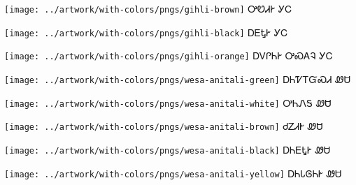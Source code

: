\documentclass[avery5371]{flashcards}%
\begin{document}
    \begin{flashcard}{
        \texttt{[image: ../artwork/with-colors/pngs/gihli-brown]}
    }
        \Huge ᎤᏬᏗᎨ ᎩᏟ
    \end{flashcard}

    \begin{flashcard}{
        \texttt{[image: ../artwork/with-colors/pngs/gihli-black]}
    }
        \Huge ᎠᎬᎿᎨ ᎩᏟ
    \end{flashcard}

    \begin{flashcard}{
        \texttt{[image: ../artwork/with-colors/pngs/gihli-orange]}
    }
        \Huge ᎠᏙᎵᏂᎨ ᎤᏍᎪᎸ ᎩᏟ
    \end{flashcard}

    \begin{flashcard}{
        \texttt{[image: ../artwork/with-colors/pngs/wesa-anitali-green]}
    }
        \Huge ᎠᏂᏤᎢᏳᏍᏗ ᏪᏌ
    \end{flashcard}

    \begin{flashcard}{
        \texttt{[image: ../artwork/with-colors/pngs/wesa-anitali-white]}
    }
        \Huge ᎤᏂᏁᎦ ᏪᏌ
    \end{flashcard}

    \begin{flashcard}{
        \texttt{[image: ../artwork/with-colors/pngs/wesa-anitali-brown]}
    }
        \Huge ᏧᏃᏗᎨ ᏪᏌ
    \end{flashcard}

    \begin{flashcard}{
        \texttt{[image: ../artwork/with-colors/pngs/wesa-anitali-black]}
    }
        \Huge ᎠᏂᎬᎿᎨ ᏪᏌ
    \end{flashcard}

    \begin{flashcard}{
        \texttt{[image: ../artwork/with-colors/pngs/wesa-anitali-yellow]}
    }
        \Huge ᎠᏂᏓᎶᏂᎨ ᏪᏌ
    \end{flashcard}
\end{document}
